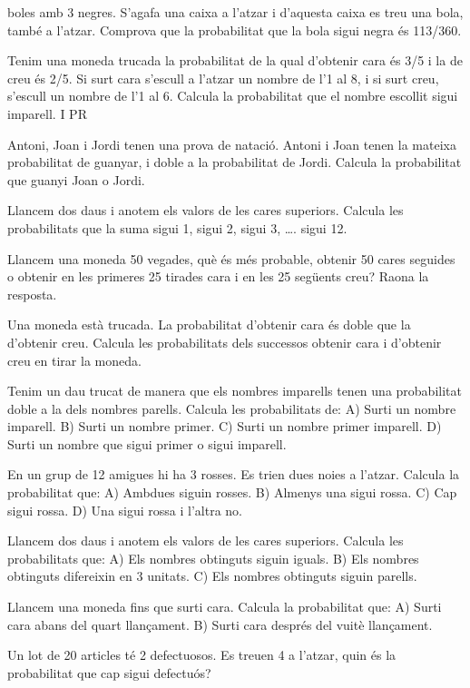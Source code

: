 \begin{mylist}
boles amb 3 negres. S'agafa una caixa a l'atzar i d'aquesta caixa es
treu una bola, també a l'atzar. Comprova que la probabilitat que la
bola sigui negra és 113/360.
\item
Tenim una moneda trucada la probabilitat de la qual d'obtenir cara és
3/5 i la de creu és 2/5. Si surt cara s'escull a l'atzar un nombre de
l'1 al 8, i si surt creu, s'escull un nombre de l'1 al 6. Calcula la
probabilitat que el nombre escollit sigui imparell. I PR
\item
Antoni, Joan i Jordi tenen una prova de natació. Antoni i Joan tenen
la mateixa probabilitat de guanyar, i doble a la probabilitat de
Jordi. Calcula la probabilitat que guanyi Joan o Jordi.
\item
Llancem dos daus i anotem els valors de les cares superiors. Calcula
les probabilitats que la suma sigui 1, sigui 2, sigui 3, \ldots{}.
sigui 12.
\item
Llancem una moneda 50 vegades, què és més probable, obtenir 50 cares
seguides o obtenir en les primeres 25 tirades cara i en les 25
següents creu? Raona la resposta.
\item
Una moneda està trucada. La probabilitat d'obtenir cara és doble que
la d'obtenir creu. Calcula les probabilitats dels successos obtenir
cara i d'obtenir creu en tirar la moneda.
\item
Tenim un dau trucat de manera que els nombres imparells tenen una
probabilitat doble a la dels nombres parells. Calcula les
probabilitats de: A) Surti un nombre imparell. B) Surti un nombre
primer. C) Surti un nombre primer imparell. D) Surti un nombre que
sigui primer o sigui imparell.
\item
En un grup de 12 amigues hi ha 3 rosses. Es trien dues noies a
l'atzar. Calcula la probabilitat que: A) Ambdues siguin rosses. B)
Almenys una sigui rossa. C) Cap sigui rossa. D) Una sigui rossa i
l'altra no.
\item
Llancem dos daus i anotem els valors de les cares superiors. Calcula
les probabilitats que: A) Els nombres obtinguts siguin iguals. B) Els
nombres obtinguts difereixin en 3 unitats. C) Els nombres obtinguts
siguin parells.
\item
Llancem una moneda fins que surti cara. Calcula la probabilitat que:
A) Surti cara abans del quart llançament. B) Surti cara després del
vuitè llançament.
\item
Un lot de 20 articles té 2 defectuosos. Es treuen 4 a l'atzar, quin és
la probabilitat que cap sigui defectuós?
\end{mylist}
 

